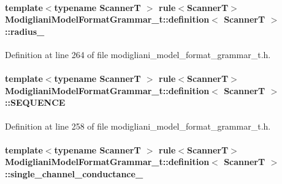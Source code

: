 \paragraph[{radius\_\-}]{\setlength{\rightskip}{0pt plus 5cm}template$<$typename ScannerT $>$ rule$<$ScannerT$>$ {\bf ModiglianiModelFormatGrammar\_\-t::definition}$<$ ScannerT $>$::{\bf radius\_\-}}\hfill\label{struct_modigliani_model_format_grammar__t_1_1definition_aa819398f92f6fc257948d09a0097c4b5}


Definition at line 264 of file modigliani\_\-model\_\-format\_\-grammar\_\-t.h.

\paragraph[{SEQUENCE}]{\setlength{\rightskip}{0pt plus 5cm}template$<$typename ScannerT $>$ rule$<$ScannerT$>$ {\bf ModiglianiModelFormatGrammar\_\-t::definition}$<$ ScannerT $>$::{\bf SEQUENCE}}\hfill\label{struct_modigliani_model_format_grammar__t_1_1definition_ad2bb9ea416129790af89bcfd41f1eb29}


Definition at line 258 of file modigliani\_\-model\_\-format\_\-grammar\_\-t.h.

\paragraph[{single\_\-channel\_\-conductance\_\-}]{\setlength{\rightskip}{0pt plus 5cm}template$<$typename ScannerT $>$ rule$<$ScannerT$>$ {\bf ModiglianiModelFormatGrammar\_\-t::definition}$<$ ScannerT $>$::{\bf single\_\-channel\_\-conductance\_\-}}\hfill\label{struct_modigliani_model_format_grammar__t_1_1definition_a5efd98051e0e7abba2fea09c630852c0}


